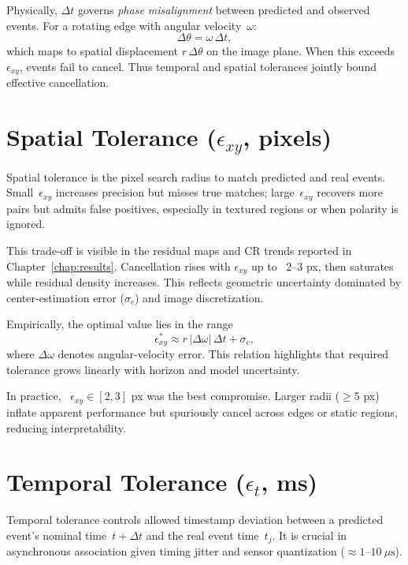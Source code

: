 Physically, \(\Delta t\) governs \textit{phase misalignment} between predicted and observed events. For a rotating edge with angular velocity~\(\omega\):
\[
\Delta \theta = \omega \, \Delta t,
\]
which maps to spatial displacement \(r\,\Delta\theta\) on the image plane. When this exceeds \(\epsilon_{xy}\), events fail to cancel. Thus temporal and spatial tolerances jointly bound effective cancellation.

\section{Spatial Tolerance (\( \epsilon_{xy} \), pixels)}
\label{sec:spatial_tolerance}

Spatial tolerance is the pixel search radius to match predicted and real events. Small~\(\epsilon_{xy}\) increases precision but misses true matches; large~\(\epsilon_{xy}\) recovers more pairs but admits false positives, especially in textured regions or when polarity is ignored.

This trade-off is visible in the residual maps and CR trends reported in Chapter~\ref{chap:results}.
Cancellation rises with \(\epsilon_{xy}\) up to ~2–3 px, then saturates while residual density increases. This reflects geometric uncertainty dominated by center-estimation error (\(\sigma_c\)) and image discretization.

Empirically, the optimal value lies in the range
\[
\epsilon_{xy}^{*} \approx r\,|\Delta\omega|\,\Delta t + \sigma_c,
\]
where \(\Delta\omega\) denotes angular-velocity error.
This relation highlights that required tolerance grows linearly with horizon and model uncertainty.

In practice, ~\(\epsilon_{xy}\in[2,3]\) px was the best compromise. Larger radii ($\geq 5$ px) inflate apparent performance but spuriously cancel across edges or static regions, reducing interpretability.

\section{Temporal Tolerance (\( \epsilon_{t} \), ms)}
\label{sec:temporal_tolerance}

Temporal tolerance controls allowed timestamp deviation between a predicted event’s nominal time~\(t+\Delta t\) and the real event time~\(t_j\). It is crucial in asynchronous association given timing jitter and sensor quantization (\( \approx 1\text{--}10~\mu\text{s} \)).

